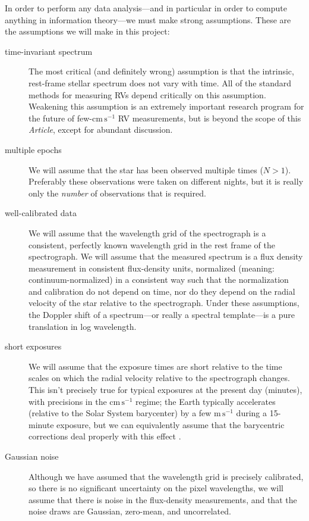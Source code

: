 \documentclass[modern]{aastex631}
\newcommand{\unit}[1]{\mathrm{#1}}
\newcommand{\m}{\unit{m}}
\newcommand{\cm}{\unit{cm}}
\newcommand{\s}{\unit{s}}
\newcommand{\cmps}{\cm\,\s^{-1}}
\newcommand{\mps}{\m\,\s^{-1}}
\newcommand{\documentname}{\textsl{Article}}
\begin{document}
In order to perform any data analysis---and in particular in order to compute anything in information theory---we must make strong assumptions.
These are the assumptions we will make in this project:
\begin{description}
    \item[time-invariant spectrum]
    The most critical (and definitely wrong) assumption is that the intrinsic, rest-frame stellar spectrum does not vary with time.
    All of the standard methods for measuring RVs depend critically on this assumption.
    Weakening this assumption is an extremely important research program for the future of few-$\cmps$ RV measurements, but is beyond the scope of this \documentname, except for abundant discussion.
    \item[multiple epochs]
    We will assume that the star has been observed multiple times ($N>1$). Preferably these observations were taken on different nights, but it is really only the \emph{number} of observations that is required.
    \item[well-calibrated data]
    We will assume that the wavelength grid of the spectrograph is a consistent, perfectly known wavelength grid in the rest frame of the spectrograph.
    We will assume that the measured spectrum is a flux density measurement in consistent flux-density units, normalized (meaning: continuum-normalized) in a consistent way such that the normalization and calibration do not depend on time, nor do they depend on the radial velocity of the star relative to the spectrograph.
    Under these assumptions, the Doppler shift of a spectrum---or really a spectral template---is a pure translation in log wavelength. 
    \item[short exposures]
    We will assume that the exposure times are short relative to the time scales on which the radial velocity relative to the spectrograph changes.
    This isn't precisely true for typical exposures at the present day (minutes), with precisions in the $\cmps$ regime; the Earth typically accelerates (relative to the Solar System barycenter) by a few $\mps$ during a 15-minute exposure, but we can equivalently assume that the barycentric corrections deal properly with this effect \citep{wright, berv-lambda}.
    \item[Gaussian noise]
    Although we have assumed that the wavelength grid is precisely calibrated, so there is no significant uncertainty on the pixel wavelengths, we will assume that there is noise in the flux-density measurements, and that the noise draws are Gaussian, zero-mean, and uncorrelated.

\end{description}
\end{document}
